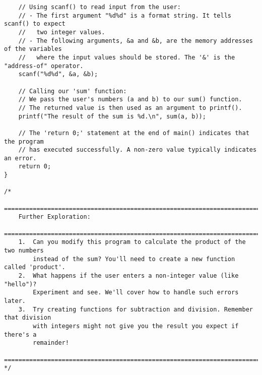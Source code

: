 \documentclass[11pt]{book}
\begin{document}
\begin{verbatim}
    // Using scanf() to read input from the user:
    // - The first argument "%d%d" is a format string. It tells scanf() to expect
    //   two integer values.
    // - The following arguments, &a and &b, are the memory addresses of the variables
    //   where the input values should be stored. The '&' is the "address-of" operator.
    scanf("%d%d", &a, &b);

    // Calling our 'sum' function:
    // We pass the user's numbers (a and b) to our sum() function.
    // The returned value is then used as an argument to printf().
    printf("The result of the sum is %d.\n", sum(a, b));

    // The 'return 0;' statement at the end of main() indicates that the program
    // has executed successfully. A non-zero value typically indicates an error.
    return 0;
}

/*
    ================================================================================
    Further Exploration:
    ================================================================================
    1.  Can you modify this program to calculate the product of the two numbers
        instead of the sum? You'll need to create a new function called 'product'.
    2.  What happens if the user enters a non-integer value (like "hello")?
        Experiment and see. We'll cover how to handle such errors later.
    3.  Try creating functions for subtraction and division. Remember that division
        with integers might not give you the result you expect if there's a
        remainder!
    ================================================================================
*/

\end{verbatim}
\clearpage
\end{document}
